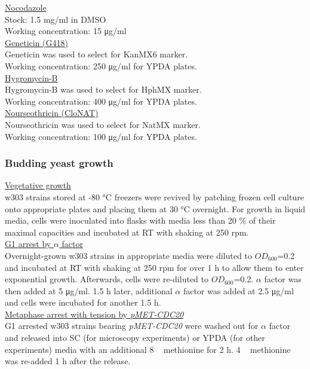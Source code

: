 \underline{Nocodazole}\\
Stock: 1.5 \si{\milli\gram/\milli\litre} in DMSO \\
Working concentration: 15 \si{\micro\gram/\milli\litre} \\

\underline{Geneticin (G418)} \\ 
Geneticin was used to select for KanMX6 marker.\\
Working concentration: 250 \si{\micro\gram/\milli\litre} for YPDA plates.\\

\underline{Hygromycin-B}\\
Hygromycin-B was used to select for HphMX marker.\\
Working concentration: 400 \si{\micro\gram/\milli\litre} for YPDA plates.\\

\underline{Nourseothricin (CloNAT)}\\
Nourseothricin was used to select for NatMX marker. \\
Working concentration: 100 \si{\micro\gram/\milli\litre} for YPDA plates.\\

\subsubsection{Budding yeast growth}
\underline{Vegetative growth}\\
w303 strains stored at -80 \si{\celsius} freezers were revived by patching frozen cell culture onto appropriate plates and placing them at 30 \si{\celsius} overnight. For growth in liquid media, cells were inoculated into flasks with media less than 20 \% of their maximal capacities and incubated at RT with shaking at 250 rpm. \\

\underline{G1 arrest by $\alpha$ factor}\\
Overnight-grown w303 strains in appropriate media were diluted to $OD_{600}$=0.2 and incubated at RT with shaking at 250 rpm for over 1 \si{\hour} to allow them to enter exponential growth. Afterwards, cells were re-diluted to $OD_{600}$=0.2. $\alpha$ factor was then added at 5 \si{\micro\gram/\milli\litre}. 1.5 \si{\hour} later, additional $\alpha$ factor was added at 2.5 \si{\micro\gram/\milli\litre} and cells were incubated for another 1.5 \si{\hour}.\\

\underline{Metaphase arrest with tension by \textit{pMET-CDC20}}\\
G1 arrested w303 strains bearing \textit{pMET-CDC20} were washed out for $\alpha$ factor and released into SC (for microscopy experiments) or YPDA (for other experiments) media with an additional 8 \si{\milli\Molar} methionine for 2 \si{\hour}. 4 \si{\milli\Molar} methionine was re-added 1 \si{\hour} after the release. \\

